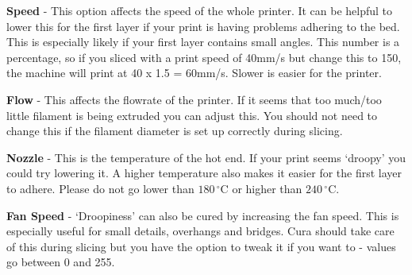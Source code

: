 \documentclass[a4paper,12pt]{article}
\begin{document}
\vspace*{2mm}
\small{
\noindent \textbf{Speed} - This option affects the speed of the whole printer. It can be helpful to lower this for the first layer if your print is having problems adhering to the bed. This is 
especially likely if your first layer contains small angles. This number is a percentage, so if you sliced with a print speed of 40mm/s but change this to 150, the machine will print at 40 x 1.5 = 60mm/s.
Slower is easier for the printer.

\vspace*{2mm}
\noindent \textbf{Flow} - This affects the flowrate of the printer. If it seems that too much/too little filament is being extruded you can adjust this. 
You should not need to change this if the filament diameter is set up correctly during slicing.

\vspace*{2mm}
\noindent \textbf{Nozzle} - This is the temperature of the hot end. If your print seems `droopy' you could try lowering it. A higher temperature 
also makes it easier for the first layer to adhere. Please do not go lower than $180\,^{\circ}$C or higher than $240\,^{\circ}$C.

\vspace*{2mm}
\noindent \textbf{Fan Speed} - `Droopiness' can also be cured by increasing the fan speed. This is especially useful for small details, overhangs and bridges. Cura
should take care of this during slicing but you have the option to tweak it if you want to - values go between 0 and 255.
}
\end{document}
